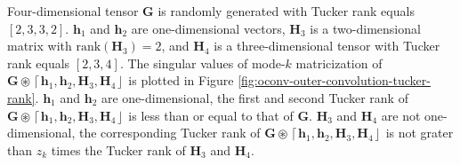 \documentclass[twoside,11pt]{article}
\def\oconv{\circledast}
\def\rank{\text{rank}}
\def\tvar#1{\mathbf{#1}} %
\def\lcerfl#1{\left\lceil{#1}\right\rfloor}
\begin{document}
Four-dimensional tensor \(\tvar{G}\) is randomly generated with Tucker rank equals \([2, 3, 3, 2]\). \(\tvar{h}_1\) and \(\tvar{h}_2\) are one-dimensional vectors, \(\tvar{H}_3\) is a two-dimensional matrix with \(\rank(\tvar{H}_3) = 2\), and \(\tvar{H}_4\) is a three-dimensional tensor with Tucker rank equals \([2, 3, 4]\).
  The singular values of mode-\(k\) matricization of \(\tvar{G} \oconv \lcerfl{\tvar{h}_1, \tvar{h}_2, \tvar{H}_3, \tvar{H}_4}\) is plotted in Figure \ref{fig:oconv-outer-convolution-tucker-rank}.
  \(\tvar{h}_1\) and \(\tvar{h}_2\) are one-dimensional, the first and second Tucker rank of \(\tvar{G} \oconv \lcerfl{\tvar{h}_1, \tvar{h}_2, \tvar{H}_3, \tvar{H}_4}\) is less than or equal to that of \(\tvar{G}\). \(\tvar{H}_3\) and \(\tvar{H}_4\) are not one-dimensional, the corresponding Tucker rank of \(\tvar{G} \oconv \lcerfl{\tvar{h}_1, \tvar{h}_2, \tvar{H}_3, \tvar{H}_4}\) is not grater than \(z_k\) times the Tucker rank of \(\tvar{H}_3\) and \(\tvar{H}_4\).
\end{document}

